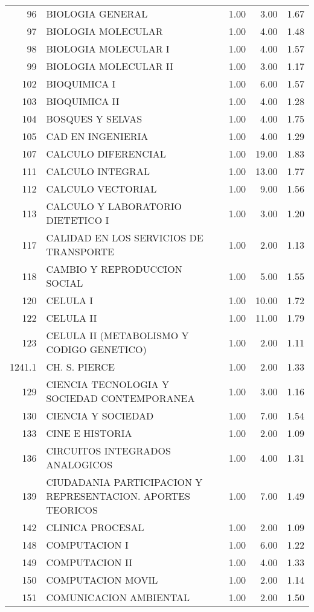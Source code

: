\documentclass[12pt]{article}
\begin{document}
\begin{table}[ht]
\begin{tabular}{rlrrr}
  96 & BIOLOGIA GENERAL & 1.00 & 3.00 & 1.67 \\ 
  97 & BIOLOGIA MOLECULAR & 1.00 & 4.00 & 1.48 \\ 
  98 & BIOLOGIA MOLECULAR I & 1.00 & 4.00 & 1.57 \\ 
  99 & BIOLOGIA MOLECULAR II & 1.00 & 3.00 & 1.17 \\ 
  102 & BIOQUIMICA I & 1.00 & 6.00 & 1.57 \\ 
  103 & BIOQUIMICA II & 1.00 & 4.00 & 1.28 \\ 
  104 & BOSQUES Y SELVAS & 1.00 & 4.00 & 1.75 \\ 
  105 & CAD EN INGENIERIA & 1.00 & 4.00 & 1.29 \\ 
  107 & CALCULO DIFERENCIAL & 1.00 & 19.00 & 1.83 \\ 
  111 & CALCULO INTEGRAL & 1.00 & 13.00 & 1.77 \\ 
  112 & CALCULO VECTORIAL & 1.00 & 9.00 & 1.56 \\ 
  113 & CALCULO Y LABORATORIO DIETETICO I & 1.00 & 3.00 & 1.20 \\ 
  117 & CALIDAD EN LOS SERVICIOS DE TRANSPORTE & 1.00 & 2.00 & 1.13 \\ 
  118 & CAMBIO Y REPRODUCCION SOCIAL & 1.00 & 5.00 & 1.55 \\ 
  120 & CELULA I & 1.00 & 10.00 & 1.72 \\ 
  122 & CELULA II & 1.00 & 11.00 & 1.79 \\ 
  123 & CELULA II (METABOLISMO Y CODIGO GENETICO) & 1.00 & 2.00 & 1.11 \\ 
  1241.1 & CH. S. PIERCE & 1.00 & 2.00 & 1.33 \\ 
  129 & CIENCIA TECNOLOGIA Y SOCIEDAD CONTEMPORANEA & 1.00 & 3.00 & 1.16 \\ 
  130 & CIENCIA Y SOCIEDAD & 1.00 & 7.00 & 1.54 \\ 
  133 & CINE E HISTORIA & 1.00 & 2.00 & 1.09 \\ 
  136 & CIRCUITOS INTEGRADOS ANALOGICOS & 1.00 & 4.00 & 1.31 \\ 
  139 & CIUDADANIA PARTICIPACION Y REPRESENTACION. APORTES TEORICOS & 1.00 & 7.00 & 1.49 \\ 
  142 & CLINICA PROCESAL & 1.00 & 2.00 & 1.09 \\ 
  148 & COMPUTACION I & 1.00 & 6.00 & 1.22 \\ 
  149 & COMPUTACION II & 1.00 & 4.00 & 1.33 \\ 
  150 & COMPUTACION MOVIL & 1.00 & 2.00 & 1.14 \\ 
  151 & COMUNICACION AMBIENTAL & 1.00 & 2.00 & 1.50 \\ 

\end{tabular}
\end{table}
\end{document}
